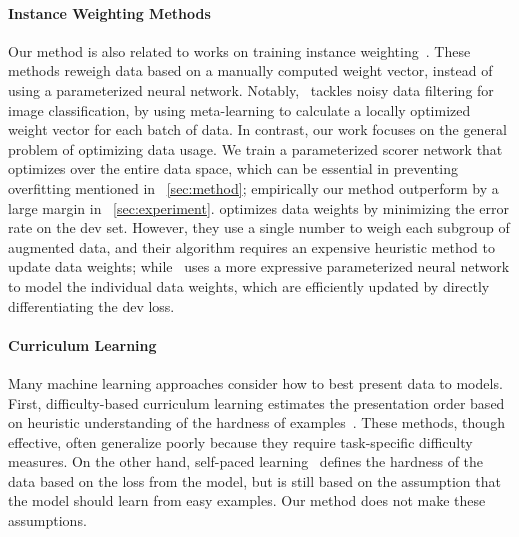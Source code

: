 \paragraph{Instance Weighting Methods} Our method is also related to works on training instance weighting~\citep{importance_weight,learn_reweight,jiang-zhai-2007-instance,domain_adapt_transfer}. These methods reweigh data based on a manually computed weight vector, instead of using a parameterized neural network.
Notably,~\citet{learn_reweight} tackles noisy data filtering for image classification, by using meta-learning to calculate a locally optimized weight vector for each batch of data.
In contrast, our work focuses on the general problem of optimizing data usage. We train a parameterized scorer network that optimizes over the entire data space, which can be essential in preventing overfitting mentioned in ~\autoref{sec:method};  empirically our method outperform \cite{learn_reweight} by a large margin in ~\autoref{sec:experiment}. \cite{importance_weight} optimizes data weights by minimizing the error rate on the dev set. However, they use a single number to weigh each subgroup of augmented data, and their algorithm requires an expensive heuristic method to update data weights; while \dds~uses a more expressive parameterized neural network to model the individual data weights, which are efficiently updated by directly differentiating the dev loss.
 
 \paragraph{Curriculum Learning} Many machine learning approaches consider how to best present data to models. First, difficulty-based curriculum learning estimates the presentation order based on heuristic understanding of the hardness of examples~\citep{cl_bengio,SpitkovskyAJ10,baysian_curriculum,zhang2016boosting,automate_cl_GravesBMMK17,zhang2018empirical,platanios19naacl}. These methods, though effective, often generalize poorly because they require task-specific difficulty measures. On the other hand, self-paced learning~\citep{spl_kumar,spl_visual_category} defines the hardness of the data based on the loss from the model, but is still based on the assumption that the model should learn from easy examples. Our method does not make these assumptions. 

